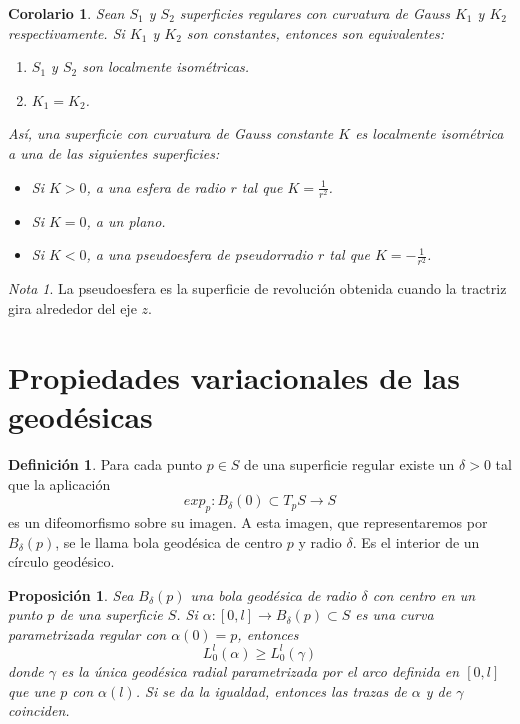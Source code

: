 \documentclass{report}
\newtheorem{corollary}[theorem]{Corolario}
\newtheorem{proposition}[theorem]{Proposición}
\theoremstyle{remark}
\theoremstyle{remark}
\newtheorem*{note}{Nota}
\theoremstyle{definition}
\newtheorem{definition}{Definición}[chapter]
\theoremstyle{definition}
\theoremstyle{definition}
\begin{document}
\begin{corollary}
    Sean $S_1$ y $S_2$ superficies regulares con curvatura de Gauss $K_1$ y $K_2$ respectivamente.
    Si $K_1$ y $K_2$ son constantes, entonces son equivalentes:
    \begin{enumerate}
        \item $S_1$ y $S_2$ son localmente isométricas.
        \item $K_1 = K_2$.
    \end{enumerate}
    Así, una superficie con curvatura de Gauss constante $K$ es localmente isométrica a una de las siguientes superficies:
    \begin{itemize}
        \item Si $K>0$, a una esfera de radio $r$ tal que $K = \frac{1}{r^2}$.
        \item Si $K=0$, a un plano.
        \item Si $K<0$, a una pseudoesfera de pseudorradio $r$ tal que $K = -\frac{1}{r^2}$.
    \end{itemize}
\end{corollary}

\begin{note}
    La pseudoesfera es la superficie de revolución obtenida cuando la tractriz gira alrededor del eje $z$.
\end{note}

\section{Propiedades variacionales de las geodésicas}

\begin{definition}
    Para cada punto $p \in S$ de una superficie regular existe un $\delta>0$ tal que la aplicación $$exp_p : B_\delta(0) \subset T_pS \to S$$ es un difeomorfismo sobre su imagen.
    A esta imagen, que representaremos por $B_\delta(p)$, se le llama bola geodésica de centro $p$ y radio $\delta$.
    Es el interior de un círculo geodésico.
\end{definition}

\begin{proposition}
    Sea $B_\delta(p)$ una bola geodésica de radio $\delta$ con centro en un punto $p$ de una superficie $S$.
    Si $\alpha : [0, l] \to B_\delta(p) \subset S$ es una curva parametrizada regular con $\alpha(0) = p$, entonces
    $$L^l_0(\alpha) \geq L^l_0(\gamma)$$
    donde $\gamma$ es la única geodésica radial parametrizada por el arco definida en $[0, l]$ que une $p$ con $\alpha(l)$.
    Si se da la igualdad, entonces las trazas de $\alpha$ y de $\gamma$ coinciden.
\end{proposition}
\end{document}
